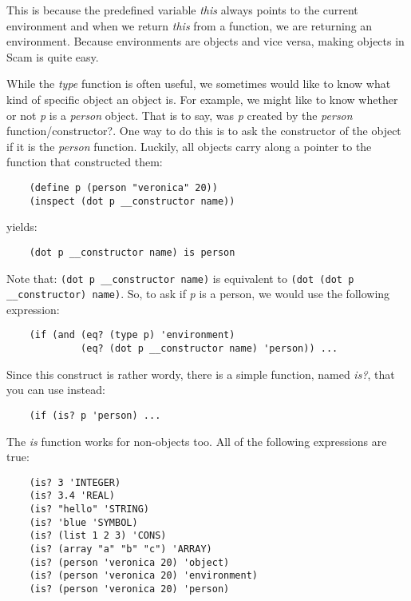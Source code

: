 This is because the predefined variable {\it this} always points to
the current environment and when we return {\it this} from a function,
we are returning an environment. Because environments are objects
and vice versa, making objects in Scam is quite easy.

While the {\it type} function is often useful, we sometimes 
would like to know what kind of specific object an object is.
For example, we might like to 
know whether or not {\it p} is a {\it person} object.
That is to say,
was {\it p} created by the {\it person} function/constructor?.
One way to do this
is to ask the constructor of the object if it is the {\it person} function.
Luckily, all objects carry along a pointer to the function
that constructed them:

\begin{verbatim}
    (define p (person "veronica" 20))
    (inspect (dot p __constructor name))
\end{verbatim}

yields:

\begin{verbatim}
    (dot p __constructor name) is person
\end{verbatim}

Note that:
\verb!(dot p __constructor name)!
is equivalent to
\verb!(dot (dot p __constructor) name)!.
So, to ask if {\it p} is a person, we would use the following
expression:

\begin{verbatim}
    (if (and (eq? (type p) 'environment)
             (eq? (dot p __constructor name) 'person)) ...
\end{verbatim}

Since this construct is rather wordy, there
is a simple function, named {\it is?}, that you can use instead:

\begin{verbatim}
    (if (is? p 'person) ...
\end{verbatim}

The {\it is} function works for non-objects too. All of the following
expressions are true:

\begin{verbatim}
    (is? 3 'INTEGER)
    (is? 3.4 'REAL)
    (is? "hello" 'STRING)
    (is? 'blue 'SYMBOL)
    (is? (list 1 2 3) 'CONS)
    (is? (array "a" "b" "c") 'ARRAY)
    (is? (person 'veronica 20) 'object)
    (is? (person 'veronica 20) 'environment)
    (is? (person 'veronica 20) 'person)
\end{verbatim}

